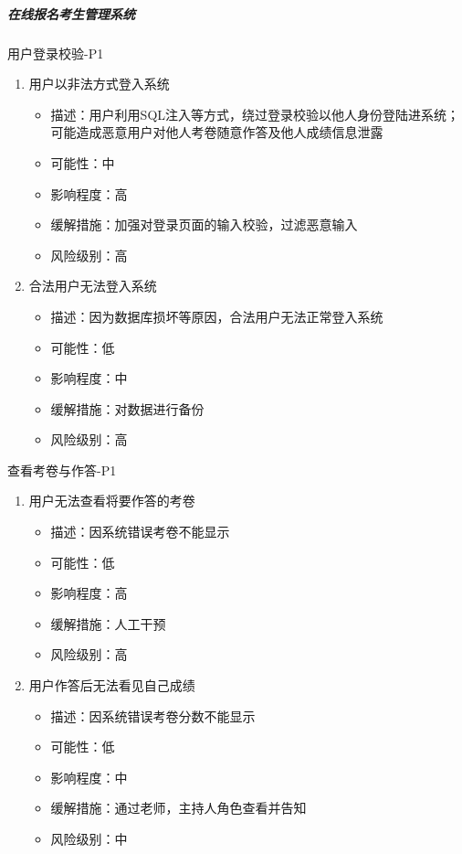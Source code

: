 \documentclass[hyperref, a4paper]{ctexart}
\providecommand{\tightlist}{%
  \setlength{\itemsep}{0pt}\setlength{\parskip}{0pt}}
\let\oldsubparagraph\subparagraph
\renewcommand{\subparagraph}[1]{\oldsubparagraph{#1}\mbox{}}
\begin{document}
\hypertarget{ux5728ux7ebfux62a5ux540dux8003ux751fux7ba1ux7406ux7cfbux7edf-1}{%
\subparagraph{在线报名考生管理系统}\label{ux5728ux7ebfux62a5ux540dux8003ux751fux7ba1ux7406ux7cfbux7edf-1}}

用户登录校验-P1

\begin{enumerate}
\def\labelenumi{\arabic{enumi}.}
\tightlist
\item
  用户以非法方式登入系统

  \begin{itemize}
  \tightlist
  \item
    描述：用户利用SQL注入等方式，绕过登录校验以他人身份登陆进系统；可能造成恶意用户对他人考卷随意作答及他人成绩信息泄露
  \item
    可能性：中
  \item
    影响程度：高
  \item
    缓解措施：加强对登录页面的输入校验，过滤恶意输入
  \item
    风险级别：高
  \end{itemize}
\item
  合法用户无法登入系统

  \begin{itemize}
  \tightlist
  \item
    描述：因为数据库损坏等原因，合法用户无法正常登入系统
  \item
    可能性：低
  \item
    影响程度：中
  \item
    缓解措施：对数据进行备份
  \item
    风险级别：高
  \end{itemize}
\end{enumerate}

查看考卷与作答-P1

\begin{enumerate}
\def\labelenumi{\arabic{enumi}.}
\tightlist
\item
  用户无法查看将要作答的考卷

  \begin{itemize}
  \tightlist
  \item
    描述：因系统错误考卷不能显示
  \item
    可能性：低
  \item
    影响程度：高
  \item
    缓解措施：人工干预
  \item
    风险级别：高
  \end{itemize}
\item
  用户作答后无法看见自己成绩

  \begin{itemize}
  \tightlist
  \item
    描述：因系统错误考卷分数不能显示
  \item
    可能性：低
  \item
    影响程度：中
  \item
    缓解措施：通过老师，主持人角色查看并告知
  \item
    风险级别：中
  \end{itemize}
\end{enumerate}
\end{document}
